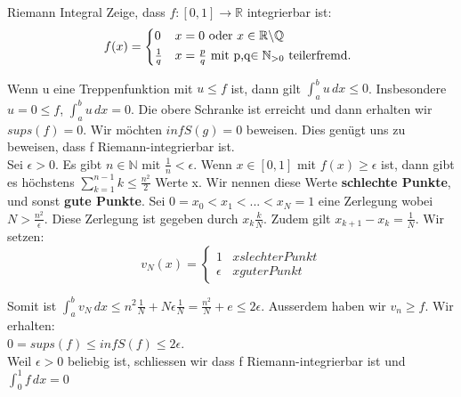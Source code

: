 \documentclass[a4paper,10pt]{article}
\def\R{\mathbb{R}}
\def\N{\mathbb{N}}
\begin{document}
\begin{subbox}{Riemann Integral}
  Zeige, dass $f:[0,1] \to \R$ integrierbar ist:
  \begin{equation*}
    f(x) =
    \begin{cases*}
      0 & $x=0$ oder $x\in\R \backslash \mathbb{Q}$\\
      \frac{1}{q} & $x=\frac{p}{q}$ mit p,q$\in \mathbb{N}_{>0}$ teilerfremd.
    \end{cases*}
  \end{equation*}

  Wenn u eine Treppenfunktion mit $u \leq f$ ist, dann gilt $\int_{a}^{b}u\,dx\leq 0$. Insbesondere $u =0\leq f$, $\int_{a}^{b}u \, dx = 0$. Die obere Schranke ist erreicht und dann erhalten wir $sup s(f) = 0$. Wir möchten $inf S(g) = 0$ beweisen. Dies genügt uns zu beweisen, dass f Riemann-integrierbar ist.\\
  
  Sei $\epsilon > 0$. Es gibt $n \in \N$ mit $\frac{1}{n} < \epsilon$. Wenn $x\in [0,1]$ mit $f(x)\geq \epsilon$ ist, dann gibt es höchstens $\sum_{k =1}^{n-1} k\leq \frac{n^2}{2}$ Werte x. Wir nennen diese Werte \textbf{schlechte Punkte}, und sonst \textbf{gute Punkte}. Sei $0 =  x_0 < x_1 < ... < x_N = 1$ eine Zerlegung wobei $N > \frac{n^2}{\epsilon}$. Diese Zerlegung ist gegeben durch $x_k \frac{k}{N}$. Zudem gilt $x_{k+1} - x_k = \frac{1}{N}$. Wir setzen: 
  \begin{equation*}
    v_N(x) = 
    \begin{cases*}
      1 & x slechter Punkt\\
      \epsilon & x guter Punkt
    \end{cases*}
  \end{equation*}

  Somit ist $\int_{a}^{b}v_N\, dx \leq n^2 \frac{1}{N} + N\epsilon\frac{1}{N} = \frac{n^2}{N} + e \leq 2\epsilon$. Ausserdem haben wir $v_n \geq f$. Wir erhalten:\\
  $0 = sup s(f) \leq inf S(f) \leq 2\epsilon$.\\
  Weil $\epsilon > 0$ beliebig ist, schliessen wir dass f Riemann-integrierbar ist und $\int_{0}^{1} f \, dx = 0$
\end{subbox}
\end{document}
